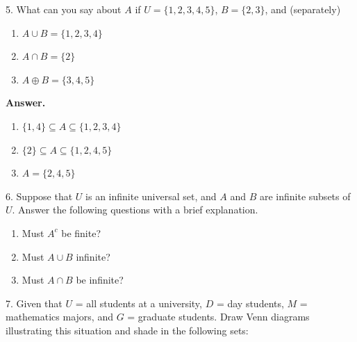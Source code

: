 \documentclass[10pt,]{book}
\theoremstyle{plain}
\theoremstyle{definition}
\theoremstyle{definition}
\theoremstyle{definition}
\theoremstyle{definition}
\begin{document}
\begin{exercisegroup}
\item[5.]\hypertarget{exercise-11}{}  What can you say about \(A\) if \(U = \{1, 2, 3, 4, 5\}\), \(B = \{2, 3\}\), and (separately) %
\par
\leavevmode%
\begin{multicols}{1}
\begin{enumerate}[label=\alph*]
\item\hypertarget{li-114}{}  \(A \cup B = \{1, 2, 3,4\}\) %
\item\hypertarget{li-115}{}  \(A \cap  B = \{2\}\) %
\item\hypertarget{li-116}{}  \(A \oplus  B = \{3, 4, 5\}\)%
\end{enumerate}
\end{multicols}
%
\par\smallskip
\par\smallskip
\noindent\textbf{Answer.}\hypertarget{answer-6}{}\quad
\leavevmode%
\begin{enumerate}[label=\alph*]
\item\hypertarget{li-117}{} \(\{1, 4\} \subseteq  A \subseteq  \{1, 2, 3, 4\}\)%
\item\hypertarget{li-118}{} \(\{2\} \subseteq  A \subseteq  \{1, 2, 4, 5\}\) %
\item\hypertarget{li-119}{} \(A = \{2, 4, 5\}\)%
\end{enumerate}
%
\item[6.]\hypertarget{exercise-12}{} Suppose that \( U\) is an infinite universal set, and \( A\) and \( B\) are infinite subsets of \( U\). Answer the following questions with a brief explanation.%
\par
\leavevmode%
\begin{multicols}{1}
\begin{enumerate}[label=\alph*]
\item\hypertarget{li-120}{}  Must \(A^c\) be finite? %
\item\hypertarget{li-121}{}  Must \(A\cup B\) infinite? %
\item\hypertarget{li-122}{}  Must \(A\cap B\) be infinite? %
\end{enumerate}
\end{multicols}
%
\par\smallskip
\item[7.]\hypertarget{exercise-13}{}  Given that \( U\) = all students at a university, \( D\) = day students, \( M\) = mathematics majors, and \( G\) = graduate students. Draw Venn diagrams illustrating this situation and shade in the following sets:%

\end{exercisegroup}
\end{document}
